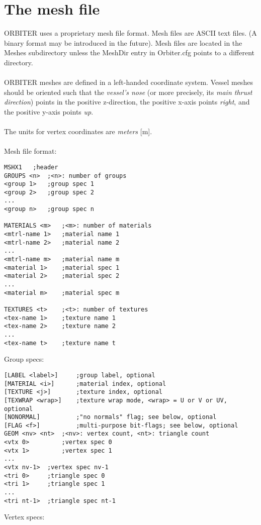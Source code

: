 \documentclass[Orbiter Developer Manual.tex]{subfiles}
\begin{document}
\section{The mesh file}
ORBITER uses a proprietary mesh file format. Mesh files are ASCII text files. (A binary format may be introduced in the future). Mesh files are located in the Meshes subdirectory unless the MeshDir entry in Orbiter.cfg points to a different directory.\\
\\
ORBITER meshes are defined in a left-handed coordinate system. Vessel meshes should be oriented such that the \textit{vessel’s nose} (or more precisely, its \textit{main thrust direction}) points in the positive z-direction, the positive x-axis points \textit{right}, and the positive y-axis points \textit{up}.\\
\\
The units for vertex coordinates are \textit{meters} [m].\\
\\
Mesh file format:
\begin{lstlisting}[language=OSFS]
MSHX1	;header
GROUPS <n>	;<n>: number of groups
<group 1>	;group spec 1
<group 2>	;group spec 2
...
<group n>	;group spec n

MATERIALS <m>	;<m>: number of materials
<mtrl-name 1>	;material name 1
<mtrl-name 2>	;material name 2
...
<mtrl-name m>	;material name m
<material 1>	;material spec 1
<material 2>	;material spec 2
...
<material m>	;material spec m

TEXTURES <t>	;<t>: number of textures
<tex-name 1>	;texture name 1
<tex-name 2>	;texture name 2
...
<tex-name t>	;texture name t
\end{lstlisting}

\noindent
Group specs:

\begin{lstlisting}[language=OSFS]
[LABEL <label>]		;group label, optional
[MATERIAL <i>]		;material index, optional
[TEXTURE <j>]		;texture index, optional
[TEXWRAP <wrap>]	;texture wrap mode, <wrap> = U or V or UV, optional
[NONORMAL]			;"no normals" flag; see below, optional
[FLAG <f>]			;multi-purpose bit-flags; see below, optional
GEOM <nv> <nt>	;<nv>: vertex count, <nt>: triangle count
<vtx 0>			;vertex spec 0
<vtx 1>			;vertex spec 1
...
<vtx nv-1>	;vertex spec nv-1
<tri 0>		;triangle spec 0
<tri 1>		;triangle spec 1
...
<tri nt-1>	;triangle spec nt-1
\end{lstlisting}

\noindent
Vertex specs:
\end{document}
